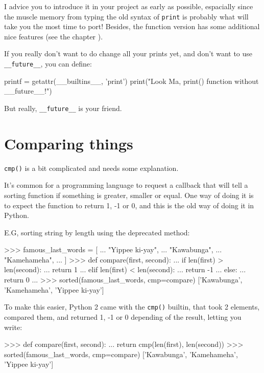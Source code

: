 I advice you to introduce it in your project as early as possible, espacially since the muscle memory from typing the old syntax of \lstinline{print} is probably what will take you the most time to port! Besides, the function version has some additional nice features (see the chapter ).

If you really don't want to do change all your prints yet, and don't want to use \lstinline{__future__}, you can define:

\begin{py2and3}
printf = getattr(__builtins__, 'print')
print("Look Ma, print() function without __future__!")
\end{py2and3}

But really, \lstinline{__future__} is your friend.

\section{Comparing things}

\lstinline{cmp()} is a bit complicated and needs some explanation.

It's common for a programming language to request a callback that will tell a sorting function if something is greater, smaller or equal. One way of doing it is to expect the function to return 1, -1 or 0, and this is the old way of doing it in Python.

E.G, sorting string by length using the deprecated method:

\begin{py2}
>>> famous_last_words = [
...     "Yippee ki-yay",
...     "Kawabunga",
...     "Kamehameha",
... ]
>>> def compare(first, second):
...     if len(first) > len(second):
...         return 1
...     elif len(first) < len(second):
...         return -1
...     else:
...         return 0
...
>>> sorted(famous_last_words, cmp=compare)
['Kawabunga', 'Kamehameha', 'Yippee ki-yay']
\end{py2}

To make this easier, Python 2 came with the \lstinline{cmp()} builtin, that took 2 elements, compared them, and returned 1, -1 or 0 depending of the result, letting you write:

\begin{py2}
>>> def compare(first, second):
...     return cmp(len(first), len(second))
>>> sorted(famous_last_words, cmp=compare)
['Kawabunga', 'Kamehameha', 'Yippee ki-yay']
\end{py2}

